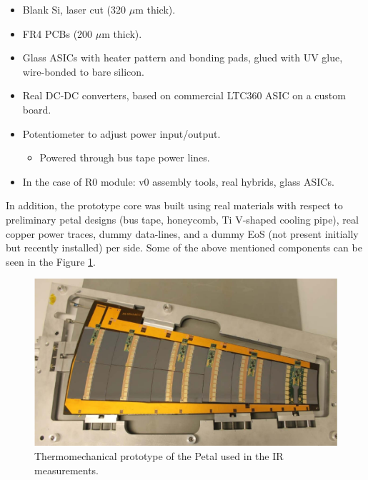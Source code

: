 		\begin{itemize}
			\renewcommand{\labelitemi}{$\diamond$}
			\item Blank Si, laser cut (320 $\mu$m thick).
			\item FR4 PCBs (200 $\mu$m thick).
			\item Glass ASICs with heater pattern and bonding pads, glued with UV glue, wire-bonded to bare silicon.
			\item Real DC-DC converters, based on commercial LTC360 ASIC on a custom board.
			\item Potentiometer to adjust power input/output.
			\begin{itemize}
			\renewcommand{\labelitemi}{$\bullet$}
				\item Powered through bus tape power lines.
			\end{itemize}
			\item In the case of R0 module: v0 assembly tools, real hybrids, glass ASICs.
		\end{itemize}
		
		In addition, the prototype core was built using real materials with respect to preliminary petal designs (bus tape, honeycomb, Ti V-shaped cooling pipe), real copper power traces, dummy data-lines, and a dummy EoS (not present initially but recently installed) per side. Some of the above mentioned components can be seen in the Figure \ref{fig2.2}.
		
		\begin{figure}[ht!]
			\centering
			\captionsetup{justification=centering,margin=2cm}
			\includegraphics[scale=0.35]{Figures/Chapter02/PetalConstruction.jpg}
			\caption{Thermomechanical prototype of the Petal  used in the IR measurements.}\label{fig2.2}
		\end{figure}\bigskip
		
